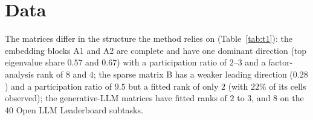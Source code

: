 \section{Data}
\label{app:data}
\begin{table}[h]
\centering\scriptsize\setlength{\tabcolsep}{3pt}

\caption{Matrices. $M$ models, $N$ benchmarks, share of observed cells, share of variance in the top eigenvalue of the correlation matrix, participation ratio of its eigenvalues, median factor-analysis rank over the fold fits (chosen by held-out likelihood), median latent share $h$ of variance, and the data version. Sources and licences: Table~\ref{tab:sources}.}
\label{tab:t1}
\end{table}
The matrices differ in the structure the method relies on (Table~\ref{tab:t1}): the embedding blocks A1 and A2 are complete and have one dominant direction (top eigenvalue share $0.57$ and $0.67$) with a participation ratio of $2$--$3$ and a factor-analysis rank of $8$ and $4$; the sparse matrix B has a weaker leading direction ($0.28$) and a participation ratio of $9.5$ but a fitted rank of only $2$ (with $22\%$ of its cells observed); the generative-LLM matrices have fitted ranks of $2$ to $3$, and $8$ on the 40 Open LLM Leaderboard subtasks.

\begin{table}[h]
\centering\scriptsize\setlength{\tabcolsep}{3pt}

\caption{Sources, versions and licences of the matrices of Table~\ref{tab:t1}. A source whose licence is stated nowhere on the dataset is marked ``none stated''; only scores are used.}
\label{tab:sources}
\end{table}

